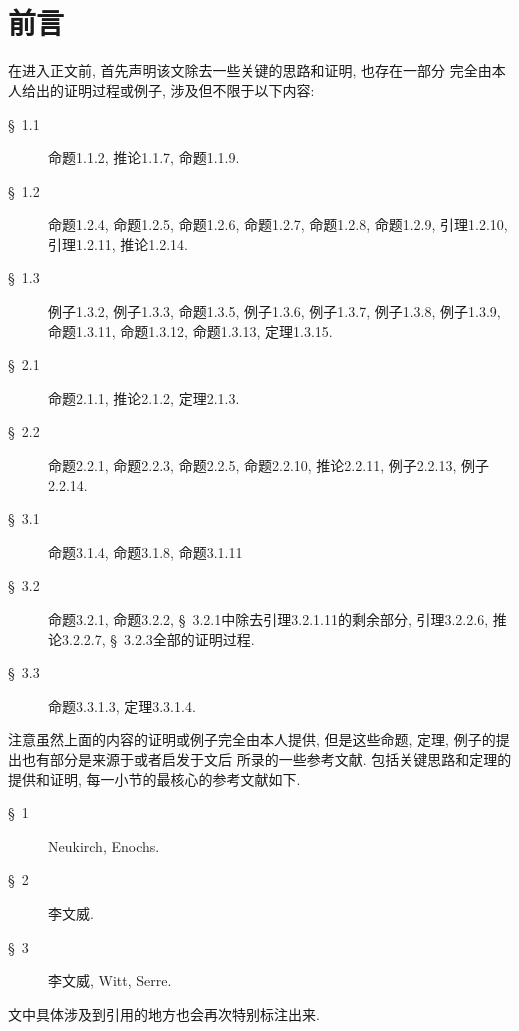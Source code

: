 \documentclass[UTF8, twoside]{ctexart}
\theoremstyle{nonumberplain}
\theoremstyle{nonumberplain}
\theoremstyle{plain}
\begin{document}
	\newpage
	\ 
	\newpage
	
	\begin{center}
		\tableofcontents
	\end{center}
	\newpage
	\ 
	\newpage
	
	\section*{前言}
	\zihao{-4}
	在进入正文前, 首先声明该文除去一些关键的思路和证明, 也存在一部分
	{\heiti 完全由本人给出的证明过程或例子}, 涉及但不限于以下内容: 
	\begin{description}
		\item[\S~1.1] 命题1.1.2, 推论1.1.7, 命题1.1.9.
		
		\item[\S~1.2] 命题1.2.4, 命题1.2.5, 命题1.2.6, 命题1.2.7, 命题1.2.8, 命题1.2.9, 
		引理1.2.10, 引理1.2.11, 推论1.2.14.
		
		\item[\S~1.3] 例子1.3.2, 例子1.3.3, 命题1.3.5, 例子1.3.6, 例子1.3.7, 例子1.3.8,
		例子1.3.9, 命题1.3.11, 命题1.3.12, 命题1.3.13, 定理1.3.15.
		
		\item [\S~2.1] 命题2.1.1, 推论2.1.2, 定理2.1.3.
		
		\item [\S~2.2] 命题2.2.1, 命题2.2.3, 命题2.2.5, 命题2.2.10, 推论2.2.11, 
		例子2.2.13, 例子2.2.14.
		
		\item[\S~3.1] 命题3.1.4, 命题3.1.8, 命题3.1.11
		
		\item[\S~3.2] 命题3.2.1, 命题3.2.2, \S~3.2.1中除去引理3.2.1.11的剩余部分, 
		引理3.2.2.6, 推论3.2.2.7, \S~3.2.3全部的证明过程.
		
		\item[\S~3.3] 命题3.3.1.3, 定理3.3.1.4.
	\end{description}
	
	注意虽然上面的内容的证明或例子完全由本人提供, 但是这些命题, 定理, 例子的提出也有部分是来源于或者启发于文后
	所录的一些参考文献. 包括关键思路和定理的提供和证明, 每一小节的最核心的参考文献如下.
	\begin{description}
		\item[\S~1] Neukirch\cite{neukirch}, Enochs\cite{enochs}.
		
		\item[\S~2] 李文威\cite{liwenwei}.
		
		\item[\S~3] 李文威\cite{liwenwei}, Witt\cite{Witt}, Serre\cite{serre}.
	\end{description}
	文中具体涉及到引用的地方也会再次特别标注出来.
	
\end{document}
